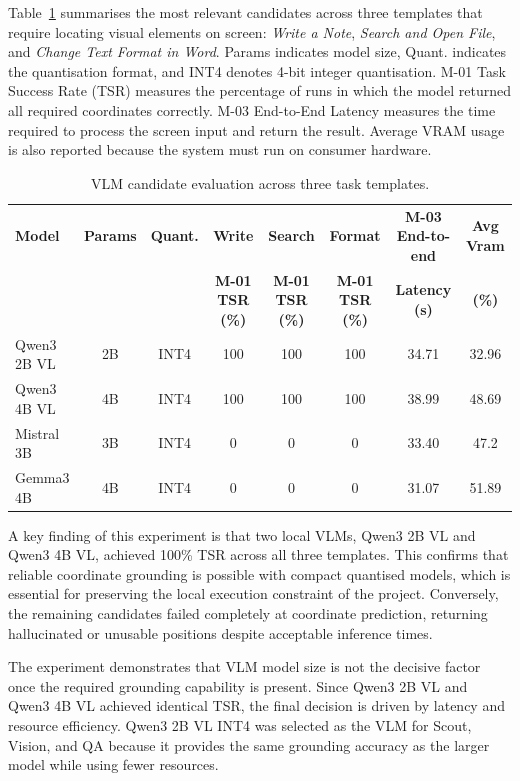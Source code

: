 Table~\ref{tab:vlm_candidates} summarises the most relevant candidates across three templates that require locating visual elements on screen: \textit{Write a Note}, \textit{Search and Open File}, and \textit{Change Text Format in Word}. Params indicates model size, Quant. indicates the quantisation format, and INT4 denotes 4-bit integer quantisation. M-01 Task Success Rate (TSR) measures the percentage of runs in which the model returned all required coordinates correctly. M-03 End-to-End Latency measures the time required to process the screen input and return the result. Average VRAM usage is also reported because the system must run on consumer hardware.

\begin{table}[H]
\centering
\footnotesize
\setlength{\tabcolsep}{4pt}
\begin{tabularx}{\textwidth}{|X|c|c|c|c|c|c|c|}
\hline
\textbf{Model} & \textbf{Params} & \textbf{Quant.} & \textbf{Write} & \textbf{Search} & \textbf{Format} & \textbf{M-03 End-to-end} & \textbf{Avg Vram} \\
 & & & \textbf{M-01 TSR (\%)} & \textbf{M-01 TSR (\%)} & \textbf{M-01 TSR (\%)} & \textbf{Latency (s)} & \textbf{(\%)} \\
\hline
Qwen3 2B VL & 2B & INT4 & 100 & 100 & 100 & 34.71 & 32.96 \\
\hline
Qwen3 4B VL & 4B & INT4 & 100 & 100 & 100 & 38.99 & 48.69 \\
\hline
Mistral 3B  & 3B & INT4 & 0   & 0   & 0   & 33.40 & 47.2  \\
\hline
Gemma3 4B   & 4B & INT4 & 0   & 0   & 0   & 31.07 & 51.89 \\
\hline
\end{tabularx}
\caption{VLM candidate evaluation across three task templates.}
\label{tab:vlm_candidates}
\end{table}

A key finding of this experiment is that two local VLMs, Qwen3 2B VL and Qwen3 4B VL, achieved 100\% TSR across all three templates. This confirms that reliable coordinate grounding is possible with compact quantised models, which is essential for preserving the local execution constraint of the project. Conversely, the remaining candidates failed completely at coordinate prediction, returning hallucinated or unusable positions despite acceptable inference times.

The experiment demonstrates that VLM model size is not the decisive factor once the required grounding capability is present. Since Qwen3 2B VL and Qwen3 4B VL achieved identical TSR, the final decision is driven by latency and resource efficiency. Qwen3 2B VL INT4 was selected as the VLM for Scout, Vision, and QA because it provides the same grounding accuracy as the larger model while using fewer resources.

